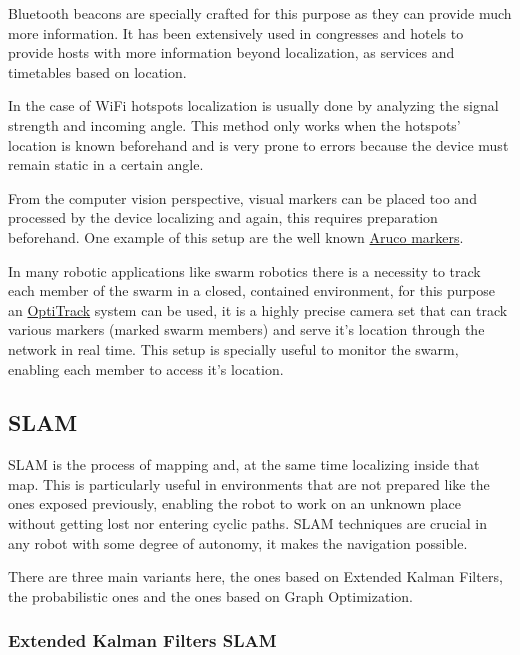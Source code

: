       Bluetooth beacons are specially crafted for this purpose as they can provide much more information. It has been extensively used in congresses and hotels to provide hosts with more information beyond localization, as services and timetables based on location. 

      In the case of WiFi hotspots localization is usually done by analyzing the signal strength and incoming angle. This method only works when the hotspots' location is known beforehand and is very prone to errors because the device must remain static in a certain angle.

      From the computer vision perspective, visual markers can be placed too and processed by the device localizing and again, this requires preparation beforehand. One example of this setup are the well known \href{https://www.uco.es/investiga/grupos/ava/node/26}{Aruco markers}.

      In many robotic applications like swarm robotics there is a necessity to track each member of the swarm in a closed, contained environment, for this purpose an \href{http://www.optitrack.com/}{OptiTrack} system can be used, it is a highly precise camera set that can track various markers (marked swarm members) and serve it's location through the network in real time. This setup is specially useful to monitor the swarm, enabling each member to access it's location.

    \subsection{SLAM} \label{ch_3:sect:localization:slam}

      SLAM is the process of mapping and, at the same time localizing inside that map. This is particularly useful in environments that are not prepared like the ones exposed previously, enabling the robot to work on an unknown place without getting lost nor entering cyclic paths. SLAM techniques are crucial in any robot with some degree of autonomy, it makes the navigation possible. 

      There are three main variants here, the ones based on Extended Kalman Filters, the probabilistic ones and the ones based on Graph Optimization.

    \subsubsection{Extended Kalman Filters SLAM} \label{ch_3:sect:localization:ekf}

